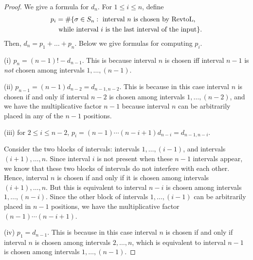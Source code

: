 \documentclass[reqno,11pt]{article} %
\theoremstyle{remark}
\newcommand{\RtoL}{\text{RevtoL}\xspace} %
\begin{document}
\begin{proof}
    We give a formula for $d_n$. For 
        $1 \le i \le n$, 
    define
        \begin{equation}    \label{eq:def_pi}
	\begin{split}
            p_i &= \#\{\sigma \in S_n: \text{ interval } n \text{ is  chosen by \RtoL,}  \\
			&\text{ while interval } i \text{ is the last interval of the input} \}.
	\end{split}
        \end{equation}
    Then,
        $d_n = p_1 + \ldots + p_n$.
    Below we give formulas for computing $p_i$.

 	(i) $p_n = (n-1)! - d_{n-1}$.             This is because interval $n$ is chosen iff interval $n-1$ is \emph{not} chosen among intervals
                $1, \ldots, (n-1)$.

       (ii)  $p_{n-1} = (n-1) d_{n-2} = d_{n-1,n-2}$.       This is because in this case interval $n$ is chosen if and only if interval $n-2$ is chosen among intervals 
                $1, \ldots, (n-2)$, 
            and we have the multiplicative factor $n-1$ because interval $n$ can be arbitrarily placed in any of the $n-1$ positions.

        (iii)  for $2 \le i \le n-2$, 
            $p_i = (n-1)\cdots(n-i+1)d_{n-i} = d_{n-1,n-i}$.
            
            Consider the two blocks of intervals: intervals 
                $1, \ldots, (i-1)$, 
            and intervals 
                $(i+1), \ldots, n$. 
            Since interval $i$ is not present when these $n-1$ intervals appear, we know that these two blocks of intervals do not interfere with each other. Hence, interval $n$ is chosen if and only if it is chosen among intervals 
                $(i+1), \ldots, n$. 
            But this is equivalent to interval $n-i$ is chosen among intervals 
                $1, \ldots, (n-i)$. 
            Since the other block of intervals 
                $1, \ldots, (i-1)$ 
            can be arbitrarily placed in $n-1$ positions, we have the multiplicative factor 
                $(n-1)\cdots(n-i+1)$.

        (iv)  $p_1 = d_{n-1}$.      This is because in this case interval $n$ is chosen if and only if interval $n$ is chosen among intervals 
                $2, \ldots, n$, 
            which is equivalent to interval $n-1$ is chosen among intervals 
                $1, \ldots, (n-1)$.


\end{proof}
\end{document}

